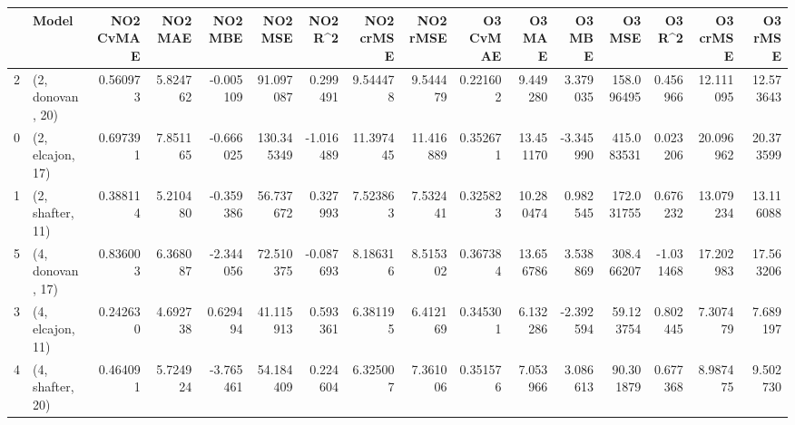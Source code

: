 \begin{tabular}{llrrrrrrrrrrrrrr}
\toprule
{} &             Model &  NO2 CvMAE &   NO2 MAE &   NO2 MBE &     NO2 MSE &   NO2 R\textasciicircum2 &  NO2 crMSE &   NO2 rMSE &  O3 CvMAE &     O3 MAE &    O3 MBE &      O3 MSE &    O3 R\textasciicircum2 &   O3 crMSE &    O3 rMSE \\
\midrule
2 &  (2, donovan, 20) &   0.560973 &  5.824762 & -0.005109 &   91.097087 &  0.299491 &   9.544478 &   9.544479 &  0.221602 &   9.449280 &  3.379035 &  158.096495 &  0.456966 &  12.111095 &  12.573643 \\
0 &  (2, elcajon, 17) &   0.697391 &  7.851165 & -0.666025 &  130.345349 & -1.016489 &  11.397445 &  11.416889 &  0.352671 &  13.451170 & -3.345990 &  415.083531 &  0.023206 &  20.096962 &  20.373599 \\
1 &  (2, shafter, 11) &   0.388114 &  5.210480 & -0.359386 &   56.737672 &  0.327993 &   7.523863 &   7.532441 &  0.325823 &  10.280474 &  0.982545 &  172.031755 &  0.676232 &  13.079234 &  13.116088 \\
5 &  (4, donovan, 17) &   0.836003 &  6.368087 & -2.344056 &   72.510375 & -0.087693 &   8.186316 &   8.515302 &  0.367384 &  13.656786 &  3.538869 &  308.466207 & -1.031468 &  17.202983 &  17.563206 \\
3 &  (4, elcajon, 11) &   0.242630 &  4.692738 &  0.629494 &   41.115913 &  0.593361 &   6.381195 &   6.412169 &  0.345301 &   6.132286 & -2.392594 &   59.123754 &  0.802445 &   7.307479 &   7.689197 \\
4 &  (4, shafter, 20) &   0.464091 &  5.724924 & -3.765461 &   54.184409 &  0.224604 &   6.325007 &   7.361006 &  0.351576 &   7.053966 &  3.086613 &   90.301879 &  0.677368 &   8.987475 &   9.502730 \\
\bottomrule
\end{tabular}
